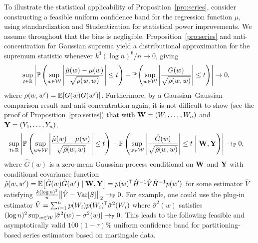 To illustrate the statistical applicability of
Proposition~\ref{pro:series}, consider constructing a feasible uniform
confidence band for the regression function $\mu$, using standardization and
Studentization for statistical power improvements. We assume throughout that
the bias is negligible. Proposition~\ref{pro:series} and anti-concentration for
Gaussian suprema \citep[Corollary~2.1]{chernozhukov2014anti} yield
a distributional approximation for the supremum statistic whenever
$k^3(\log n)^6 / n \to 0$, giving
%
\begin{align*}
  \sup_{t \in \mathbb{R}}
  \left|
  \mathbb{P}\left(
    \sup_{w \in \mathcal{W}}
    \left|
    \frac{\hat\mu(w)-\mu(w)}{\sqrt{\rho(w,w)}}
    \right| \leq t
  \right)
  -
  \mathbb{P}\left(
    \sup_{w \in \mathcal{W}}
    \left|
    \frac{G(w)}{\sqrt{\rho(w,w)}}
    \right| \leq t
  \right)
  \right|
  &\to 0,
\end{align*}
%
where $\rho(w,w') = \mathbb{E}[G(w)G(w')]$. Furthermore, by a Gaussian--Gaussian
comparison result \citep[Lemma~3.1]{chernozhukov2013gaussian} and
anti-concentration again, it is not difficult to show (see the proof of
Proposition~\ref{pro:series}) that with $\mathbf{W} = (W_1, \ldots, W_n)$ and
$\mathbf{Y} = (Y_1, \ldots, Y_n)$,
%
\begin{align*}
  \sup_{t \in \mathbb{R}}
  \left|
  \mathbb{P}\left(
    \sup_{w \in \mathcal{W}}
    \left|
    \frac{\hat\mu(w)-\mu(w)}{\sqrt{\hat\rho(w,w)}}
    \right| \leq t
  \right)
  - \mathbb{P}\left(
    \sup_{w \in \mathcal{W}}
    \left|
    \frac{\hat G(w)}{\sqrt{\hat\rho(w,w)}}
    \right| \leq t \biggm| \mathbf{W}, \mathbf{Y}
  \right)
  \right|
  &\to_{\mathbb{P}} 0,
\end{align*}
%
where $\hat G(w)$ is a zero-mean Gaussian process
conditional on $\mathbf{W}$ and $\mathbf{Y}$ with conditional covariance function
$\hat\rho(w,w')
=\mathbb{E}\big[\hat G(w) \hat G(w') \mid \mathbf{W}, \mathbf{Y} \big]
= p(w)^{\mathsf{T}} \hat H^{-1} \hat V \hat H^{-1}p(w')$
for some estimator $\hat V$ satisfying
$\frac{k (\log n)^2}{n}
\big\|\hat V-\operatorname{Var}[S]\big\|_2 \to_{\mathbb{P}} 0$.
For example, one could use the plug-in estimator
$\hat V=\sum_{i=1}^n p(W_i) p(W_i)^{\mathsf{T}} \hat{\sigma}^2(W_i)$
where $\hat{\sigma}^2(w)$ satisfies
$(\log n)^2 \sup_{w \in \mathcal{W}}
|\hat{\sigma}^2(w)-\sigma^2(w)| \to_{\mathbb{P}} 0$.
This leads to the following feasible and asymptotically valid
$100(1-\tau)\%$
uniform confidence band for partitioning-based series estimators
based on martingale data.

